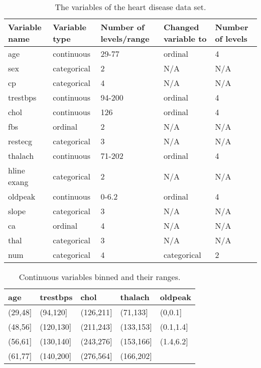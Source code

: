 \documentclass[a4paper]{article}
\begin{document}
\begin{center}
\begin{table}
    \begin{tabular}{ | l | l | l | l | l |}
    \hline
    Variable name & Variable type & Number of levels/range & Changed variable to & Number of levels \\ \hline
     age & continuous & 29-77  & ordinal & 4 \\ \hline
     sex & categorical & 2 & N/A & N/A\\ \hline
     cp	& categorical & 4 & N/A & N/A\\ \hline
     trestbps & continuous & 94-200 & ordinal & 4\\ \hline
     chol & continuous & 126 & ordinal & 4 \\ \hline
     fbs & ordinal & 2 & N/A & N/A \\ \hline
     restecg & categorical & 3 & N/A & N/A \\ \hline
     thalach & continuous & 71-202 & ordinal & 4 \\hline
     exang & categorical & 2 & N/A & N/A \\ \hline
     oldpeak & continuous & 0-6.2 & ordinal & 4\\ \hline
     slope & categorical & 3 & N/A & N/A \\ \hline
     ca & ordinal & 4 & N/A & N/A \\ \hline
     thal & categorical & 3 & N/A & N/A \\ \hline
     num & categorical & 4 & categorical & 2 \\ \hline
    \end{tabular}
	\caption{The variables of the heart disease data set.}
	\label{tab:variables} 
\end{table}
\end{center}

\begin{center}
\begin{table}
    \begin{tabular}{ | l | l | l | l | l |}
    \hline
    age & trestbps & chol & thalach & oldpeak \\ \hline
     (29,48] & (94,120] & (126,211]  & (71,133] & (0,0.1] \\ \hline
     (48,56] & (120,130] & (211,243] & (133,153] & (0.1,1.4]\\ \hline
     (56,61] & (130,140] & (243,276] & (153,166] & (1.4,6.2]\\ \hline
     (61,77] & (140,200] & (276,564] & (166,202] & \\ \hline
    \end{tabular}
    \caption{ Continuous variables binned and their ranges.}
    \label{tab:bin}
   \end{table}
\end{center}
\end{document}
